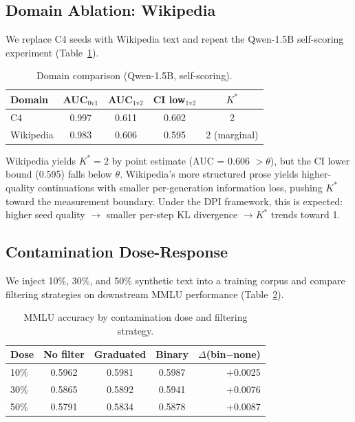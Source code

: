 \documentclass[11pt,a4paper]{article}
\newcommand{\kstar}{K^{*}}
\begin{document}
\subsection{Domain Ablation: Wikipedia}
\label{sec:domain}

We replace C4 seeds with Wikipedia text and repeat the Qwen-1.5B self-scoring experiment (Table~\ref{tab:domain}).

\begin{table}[t]
\centering
\small
\caption{Domain comparison (Qwen-1.5B, self-scoring).}
\label{tab:domain}
\begin{tabular}{lcccc}
\toprule
Domain & AUC$_{0\text{v}1}$ & AUC$_{1\text{v}2}$ & CI low$_{1\text{v}2}$ & $\kstar$ \\
\midrule
C4 & 0.997 & 0.611 & 0.602 & 2 \\
Wikipedia & 0.983 & 0.606 & 0.595 & 2 (marginal) \\
\bottomrule
\end{tabular}
\end{table}

Wikipedia yields $\kstar = 2$ by point estimate (AUC = 0.606 $> \theta$), but the CI lower bound (0.595) falls below $\theta$.
Wikipedia's more structured prose yields higher-quality continuations with smaller per-generation information loss, pushing $\kstar$ toward the measurement boundary.
Under the DPI framework, this is expected: higher seed quality $\to$ smaller per-step KL divergence $\to \kstar$ trends toward 1.

\subsection{Contamination Dose-Response}
\label{sec:dose}

We inject 10\%, 30\%, and 50\% synthetic text into a training corpus and compare filtering strategies on downstream MMLU performance (Table~\ref{tab:dose}).

\begin{table}[t]
\centering
\small
\caption{MMLU accuracy by contamination dose and filtering strategy.}
\label{tab:dose}
\begin{tabular}{lcccr}
\toprule
Dose & No filter & Graduated & Binary & $\Delta$(bin$-$none) \\
\midrule
10\% & 0.5962 & 0.5981 & 0.5987 & +0.0025 \\
30\% & 0.5865 & 0.5892 & 0.5941 & +0.0076 \\
50\% & 0.5791 & 0.5834 & 0.5878 & +0.0087 \\
\bottomrule
\end{tabular}
\end{table}
\end{document}

